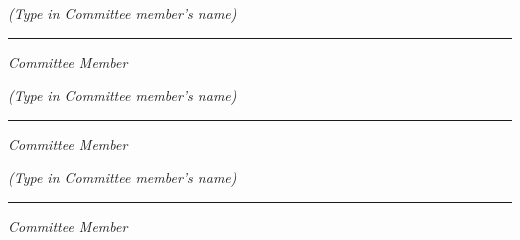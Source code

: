 \begin{flushleft}
\small
\textit{(Type in Committee member's name)}
\vspace{4pt}
\hrule
\vspace{4pt}
\large
\textit{Committee Member}

\vspace{0.2in}

\small
\textit{(Type in Committee member's name)}
\vspace{4pt}
\hrule
\vspace{4pt}
\large
\textit{Committee Member}

\vspace{0.2in}

\small
\textit{(Type in Committee member's name)}
\vspace{4pt}
\hrule
\vspace{4pt}
\large
\textit{Committee Member}

\end{flushleft}

\setlength{\baselineskip}{\doublespace}




